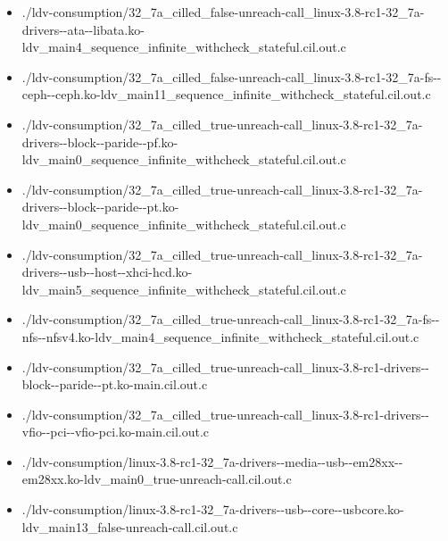 \documentclass[envcountsame]{llncs}
\begin{document}
\begin{itemize}
\item ./ldv-consumption/32\_7a\_cilled\_false-unreach-call\_linux-3.8-rc1-32\_7a-drivers-{}-ata-{}-libata.ko-ldv\_main4\_sequence\_infinite\_withcheck\_stateful.cil.out.c
\item ./ldv-consumption/32\_7a\_cilled\_false-unreach-call\_linux-3.8-rc1-32\_7a-fs-{}-ceph-{}-ceph.ko-ldv\_main11\_sequence\_infinite\_withcheck\_stateful.cil.out.c
\item ./ldv-consumption/32\_7a\_cilled\_true-unreach-call\_linux-3.8-rc1-32\_7a-drivers-{}-block-{}-paride-{}-pf.ko-ldv\_main0\_sequence\_infinite\_withcheck\_stateful.cil.out.c
\item ./ldv-consumption/32\_7a\_cilled\_true-unreach-call\_linux-3.8-rc1-32\_7a-drivers-{}-block-{}-paride-{}-pt.ko-ldv\_main0\_sequence\_infinite\_withcheck\_stateful.cil.out.c
\item ./ldv-consumption/32\_7a\_cilled\_true-unreach-call\_linux-3.8-rc1-32\_7a-drivers-{}-usb-{}-host-{}-xhci-hcd.ko-ldv\_main5\_sequence\_infinite\_withcheck\_stateful.cil.out.c
\item ./ldv-consumption/32\_7a\_cilled\_true-unreach-call\_linux-3.8-rc1-32\_7a-fs-{}-nfs-{}-nfsv4.ko-ldv\_main4\_sequence\_infinite\_withcheck\_stateful.cil.out.c
\item ./ldv-consumption/32\_7a\_cilled\_true-unreach-call\_linux-3.8-rc1-drivers-{}-block-{}-paride-{}-pt.ko-main.cil.out.c
\item ./ldv-consumption/32\_7a\_cilled\_true-unreach-call\_linux-3.8-rc1-drivers-{}-vfio-{}-pci-{}-vfio-pci.ko-main.cil.out.c
\item ./ldv-consumption/linux-3.8-rc1-32\_7a-drivers-{}-media-{}-usb-{}-em28xx-{}-em28xx.ko-ldv\_main0\_true-unreach-call.cil.out.c
\item ./ldv-consumption/linux-3.8-rc1-32\_7a-drivers-{}-usb-{}-core-{}-usbcore.ko-ldv\_main13\_false-unreach-call.cil.out.c



\end{itemize}
\end{document}
